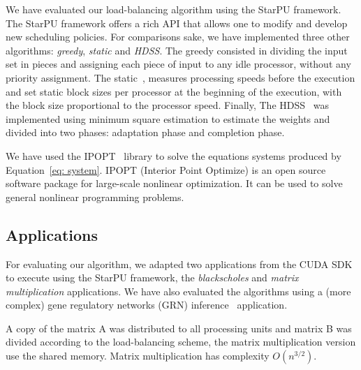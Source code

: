 \documentclass[journal]{IEEEtran}
\begin{document}
We have evaluated our load-balancing algorithm using the StarPU framework.
The StarPU framework offers a rich API that allows one to modify and develop new scheduling policies.
%
%
%
For comparisons sake, we have implemented three other algorithms:
\emph{greedy}, \emph{static} and
\emph{HDSS}. The greedy consisted in dividing the input set in pieces and assigning
each piece of input to any idle processor, without any priority assignment. The
static~\cite{raphael}, measures processing speeds before the execution and set
static block sizes per processor at the beginning of the execution, with the
block size proportional to the processor speed. Finally, The HDSS~\cite{HDSS}
was implemented using minimum square estimation to estimate the weights and
divided into two phases: adaptation phase and completion phase.

We have used the IPOPT~\cite{point} library to solve the equations systems produced by Equation~\ref{eq: system}. IPOPT (Interior Point Optimize) is an open source software package for large-scale nonlinear optimization. It can be used to solve general nonlinear programming problems.

\subsection{Applications}

For evaluating our algorithm, we adapted two applications from the CUDA
SDK~\cite{cuda} to execute using the StarPU framework, the \emph{blackscholes} and \emph{matrix
multiplication} applications. We have also evaluated the algorithms using a (more complex) gene regulatory networks (GRN) inference~\cite{borelli2013gene} application.

 A copy of the matrix A was distributed to all processing units and matrix B was divided according to
the load-balancing scheme, the matrix multiplication version use the shared memory. Matrix multiplication has complexity $O(n^{3/2})$.
\end{document}

